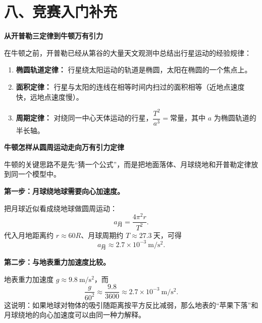 \section*{八、竞赛入门补充}

\begin{competitionbox}
\textbf{从开普勒三定律到牛顿万有引力}

在牛顿之前，开普勒已经从第谷的大量天文观测中总结出行星运动的经验规律：

\begin{enumerate}
  \item \textbf{椭圆轨道定律：} 行星绕太阳运动的轨道是椭圆，太阳在椭圆的一个焦点上。
  \item \textbf{面积定律：} 行星与太阳的连线在相等时间内扫过的面积相等（近地点速度快，远地点速度慢）。
  \item \textbf{周期定律：} 对绕同一中心天体运动的行星，$\dfrac{T^2}{a^3} = \text{常量}$，其中 $a$ 为椭圆轨道的半长轴。
\end{enumerate}

\begin{center}


\label{fig:kepler-laws}
\end{center}

\textbf{牛顿怎样从圆周运动走向万有引力定律}

牛顿的关键思路不是先“猜一个公式”，而是把地面落体、月球绕地和开普勒定律放到同一个模型中。

\begin{center}


\label{fig:newton-moon-test}
\end{center}

\textbf{第一步：月球绕地球需要向心加速度。}

把月球近似看成绕地球做圆周运动：
\[
a_{\text{月}}=\frac{4\pi^2r}{T^2}.
\]
代入月地距离约 $r\approx 60R$、月球周期约 $T\approx 27.3\ \text{天}$，可得
\[
a_{\text{月}}\approx 2.7\times 10^{-3}\ \mathrm{m/s^2}.
\]

\textbf{第二步：与地表重力加速度比较。}

地表重力加速度 $g\approx 9.8\ \mathrm{m/s^2}$，而
\[
\frac{g}{60^2}\approx \frac{9.8}{3600}\approx 2.7\times 10^{-3}\ \mathrm{m/s^2}.
\]
这说明：如果地球对物体的吸引随距离按平方反比减弱，那么地表的“苹果下落”和月球绕地的向心加速度可以由同一种力解释。


\end{competitionbox}
